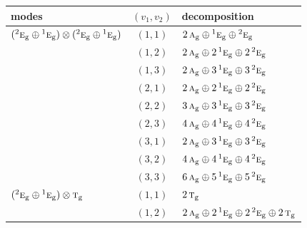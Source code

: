 \documentclass[11pt]{article}
\newcommand{\irr}[1]{\text{\normalfont\scshape #1}}
\newcommand{\conjpair}[1]{{}^{#1}}
\newcommand{\ptag}[1]{\mathrm{#1}}
\begin{document}
\begin{longtable}{p{} c p{}}\hline modes & $(v_1,v_2)$ & decomposition\\ \hline\endhead

$(\conjpair{2}\irr{e}_{\ptag{g}}\oplus \conjpair{1}\irr{e}_{\ptag{g}})\otimes (\conjpair{2}\irr{e}_{\ptag{g}}\oplus \conjpair{1}\irr{e}_{\ptag{g}})$ & $(1,1)$ & $2\,\irr{a}_{\ptag{g}}\oplus \conjpair{1}\irr{e}_{\ptag{g}}\oplus \conjpair{2}\irr{e}_{\ptag{g}}$\\

 & $(1,2)$ & $2\,\irr{a}_{\ptag{g}}\oplus 2\,\conjpair{1}\irr{e}_{\ptag{g}}\oplus 2\,\conjpair{2}\irr{e}_{\ptag{g}}$\\

 & $(1,3)$ & $2\,\irr{a}_{\ptag{g}}\oplus 3\,\conjpair{1}\irr{e}_{\ptag{g}}\oplus 3\,\conjpair{2}\irr{e}_{\ptag{g}}$\\

 & $(2,1)$ & $2\,\irr{a}_{\ptag{g}}\oplus 2\,\conjpair{1}\irr{e}_{\ptag{g}}\oplus 2\,\conjpair{2}\irr{e}_{\ptag{g}}$\\

 & $(2,2)$ & $3\,\irr{a}_{\ptag{g}}\oplus 3\,\conjpair{1}\irr{e}_{\ptag{g}}\oplus 3\,\conjpair{2}\irr{e}_{\ptag{g}}$\\

 & $(2,3)$ & $4\,\irr{a}_{\ptag{g}}\oplus 4\,\conjpair{1}\irr{e}_{\ptag{g}}\oplus 4\,\conjpair{2}\irr{e}_{\ptag{g}}$\\

 & $(3,1)$ & $2\,\irr{a}_{\ptag{g}}\oplus 3\,\conjpair{1}\irr{e}_{\ptag{g}}\oplus 3\,\conjpair{2}\irr{e}_{\ptag{g}}$\\

 & $(3,2)$ & $4\,\irr{a}_{\ptag{g}}\oplus 4\,\conjpair{1}\irr{e}_{\ptag{g}}\oplus 4\,\conjpair{2}\irr{e}_{\ptag{g}}$\\

 & $(3,3)$ & $6\,\irr{a}_{\ptag{g}}\oplus 5\,\conjpair{1}\irr{e}_{\ptag{g}}\oplus 5\,\conjpair{2}\irr{e}_{\ptag{g}}$\\

\hline

$(\conjpair{2}\irr{e}_{\ptag{g}}\oplus \conjpair{1}\irr{e}_{\ptag{g}})\otimes \irr{t}_{\ptag{g}}$ & $(1,1)$ & $2\,\irr{t}_{\ptag{g}}$\\

 & $(1,2)$ & $2\,\irr{a}_{\ptag{g}}\oplus 2\,\conjpair{1}\irr{e}_{\ptag{g}}\oplus 2\,\conjpair{2}\irr{e}_{\ptag{g}}\oplus 2\,\irr{t}_{\ptag{g}}$\\


\end{longtable}
\end{document}
